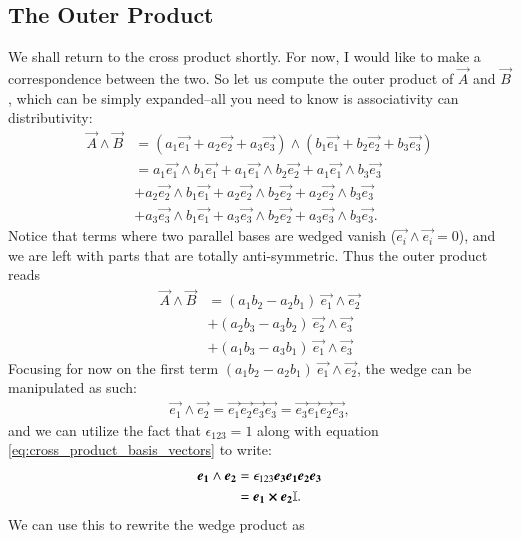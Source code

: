 \subsection{The Outer Product}
We shall return to the cross product shortly. For now, I would like to make a correspondence between the two. So let us compute the outer product of $\vec{A} $ and $\vec{B} $, which can be simply expanded--all you need to know is associativity can distributivity:
\begin{align*}
    \vec{A} \wedge \vec{B}  &= (a_1 \vec{e_1} + a_2 \vec{e_2} + a_3 \vec{e_3}) \wedge (b_1 \vec{e_1} + b_2 \vec{e_2} + b_3 \vec{e_3}) \\
                &= a_1 \vec{e_1} \wedge b_1 \vec{e_1} + a_1 \vec{e_1} \wedge b_2 \vec{e_2} + a_1 \vec{e_1} \wedge b_3 \vec{e_3} \\
                &+ a_2 \vec{e_2} \wedge b_1 \vec{e_1} + a_2 \vec{e_2} \wedge b_2 \vec{e_2} + a_2 \vec{e_2} \wedge b_3 \vec{e_3} \\
                &+ a_3 \vec{e_3} \wedge b_1 \vec{e_1} + a_3 \vec{e_3} \wedge b_2 \vec{e_2} + a_3 \vec{e_3} \wedge b_3 \vec{e_3}.
\end{align*}
Notice that terms where two parallel bases are wedged vanish ($\vec{e_i} \wedge \vec{e_i} = 0$), and we are left with parts that are totally anti-symmetric. Thus the outer product reads
\begin{align*}
    \vec{A}  \wedge \vec{B}   &= (a_1 b_2 - a_2 b_1) \ \vec{e_1} \wedge \vec{e_2} \\
                &+ (a_2 b_3 - a_3 b_2) \ \vec{e_2} \wedge \vec{e_3} \\
                &+ (a_1 b_3 - a_3 b_1 ) \ \vec{e_1} \wedge \vec{e_3} 
\end{align*}
Focusing for now on the first term $ (a_1 b_2 - a_2 b_1) \ \vec{e_1} \wedge \vec{e_2}$, the wedge can be manipulated as such:
\begin{align*}
    \vec{e_1} \wedge \vec{e_2} = \vec{e_1} \vec{e_2} \vec{e_3} \vec{e_3} =  \vec{e_3} \vec{e_1} \vec{e_2} \vec{e_3},
\end{align*}
and we can utilize the fact that $\epsilon_{123} = 1$ along with equation \eqref{eq:cross_product_basis_vectors} to write:
\begin{align*}
    \boldsymbol{e_1} \wedge \boldsymbol{e_2} &= \epsilon_{123} \boldsymbol{e_3} \boldsymbol{e_1} \boldsymbol{e_2} \boldsymbol{e_3} \\
                    &= \boldsymbol{e_1} \cross \boldsymbol{e_2} \mathbb{I}.
\end{align*}
We can use this to rewrite the wedge product as 
